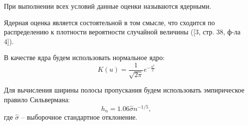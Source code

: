 При выполнении всех условий данные оценки называются ядерными.

Ядерная оценка является состоятельной в том смысле, что сходится по распределению к плотности вероятности случайной величины ([3, стр. 38, ф-ла 4]).

В качестве ядра будем использовать нормальное ядро:
\begin{equation}
K(u)=\frac{1}{\sqrt{2\pi}}e^{-\frac{u^2}{2}}
\end{equation}

Для вычисления ширины полосы пропускания будем использовать эмпирическое правило Сильвермана:
\begin{equation}
h_n=1.06\hat{\sigma}n^{-1/5},
\end{equation}
где $\hat{\sigma}$ -- выборочное стандартное отклонение.
